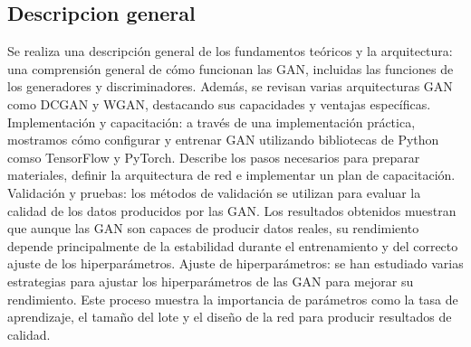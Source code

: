 \subsection{Descripcion general} 
Se realiza una descripción general de los fundamentos teóricos y la arquitectura: una comprensión general de cómo funcionan las GAN, incluidas las funciones de los generadores y discriminadores. Además, se revisan varias arquitecturas GAN como DCGAN y WGAN, destacando sus capacidades y ventajas específicas. Implementación y capacitación: a través de una implementación práctica, mostramos cómo configurar y entrenar GAN utilizando bibliotecas de Python comso TensorFlow y PyTorch. Describe los pasos necesarios para preparar materiales, definir la arquitectura de red e implementar un plan de capacitación. Validación y pruebas: los métodos de validación se utilizan para evaluar la calidad de los datos producidos por las GAN. Los resultados obtenidos muestran que aunque las GAN son capaces de producir datos reales, su rendimiento depende principalmente de la estabilidad durante el entrenamiento y del correcto ajuste de los hiperparámetros. Ajuste de hiperparámetros: se han estudiado varias estrategias para ajustar los hiperparámetros de las GAN para mejorar su rendimiento. Este proceso muestra la importancia de parámetros como la tasa de aprendizaje, el tamaño del lote y el diseño de la red para producir resultados de calidad.
